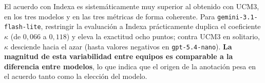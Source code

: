 \begin{table}[H]
    \centering
    \begingroup
    \small
    \endgroup
\end{table}

El acuerdo con Indexa es sistemáticamente muy superior al obtenido con UCM3, en
los tres modelos y en las tres métricas de forma coherente. Para
\texttt{gemini-3.1-flash-lite}, restringir la evaluación a Indexa prácticamente
duplica el coeficiente $\kappa$ (de $0,066$ a $0,118$) y eleva la exactitud
ocho puntos; contra UCM3 en solitario, $\kappa$ desciende hacia el azar (hasta
valores negativos en \texttt{gpt-5.4-nano}). \textbf{La magnitud de esta
variabilidad entre equipos es comparable a la diferencia entre modelos}, lo que
indica que el origen de la anotación pesa en el acuerdo tanto como la elección
del modelo.


